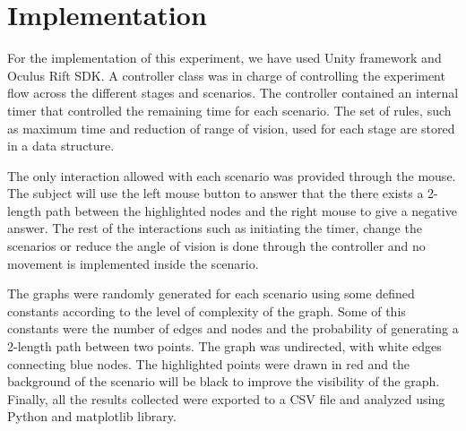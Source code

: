\chapter{Implementation}

For the implementation of this experiment, we have used Unity framework
and Oculus Rift SDK. A controller class was in charge of controlling the
experiment flow across the different stages and scenarios. The
controller contained an internal timer that controlled the remaining
time for each scenario. The set of rules, such as maximum time and
reduction of range of vision, used for each stage are stored in a data
structure.

The only interaction allowed with each scenario was provided through the
mouse. The subject will use the left mouse button to answer that the
there exists a 2-length path between the highlighted nodes and the right
mouse to give a negative answer. The rest of the interactions such as
initiating the timer, change the scenarios or reduce the angle of vision
is done through the controller and no movement is implemented inside the
scenario.

The graphs were randomly generated for each scenario using some defined
constants according to the level of complexity of the graph. Some of
this constants were the number of edges and nodes and the probability of
generating a 2-length path between two points. The graph was undirected,
with white edges connecting blue nodes. The highlighted points were
drawn in red and the background of the scenario will be black to improve
the visibility of the graph. Finally, all the results collected were
exported to a CSV file and analyzed using Python and matplotlib library.